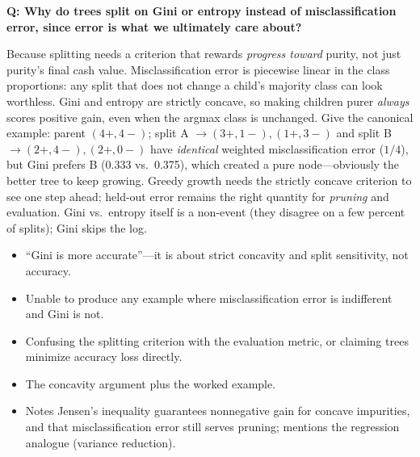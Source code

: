 \begin{interviewq}
\textbf{Q: Why do trees split on Gini or entropy instead of misclassification error, since error is what we ultimately care about?}

 \quad {} \quad \badgefreq{\freqmed}

\stronganswer

Because splitting needs a criterion that rewards \textit{progress toward} purity, not just purity's final cash value. Misclassification error is piecewise linear in the class proportions: any split that does not change a child's majority class can look worthless. Gini and entropy are strictly concave, so making children purer \textit{always} scores positive gain, even when the argmax class is unchanged. Give the canonical example: parent $(4{+},4{-})$; split A $\to (3{+},1{-}), (1{+},3{-})$ and split B $\to (2{+},4{-}), (2{+},0{-})$ have \textit{identical} weighted misclassification error ($1/4$), but Gini prefers B (0.333 vs.\ 0.375), which created a pure node---obviously the better tree to keep growing. Greedy growth needs the strictly concave criterion to see one step ahead; held-out error remains the right quantity for \textit{pruning} and evaluation. Gini vs.\ entropy itself is a non-event (they disagree on a few percent of splits); Gini skips the log.

\redflags
\begin{itemize}
    \item ``Gini is more accurate''---it is about strict concavity and split sensitivity, not accuracy.
    \item Unable to produce any example where misclassification error is indifferent and Gini is not.
    \item Confusing the splitting criterion with the evaluation metric, or claiming trees minimize accuracy loss directly.
\end{itemize}


\goodgreat
\begin{itemize}
    \item {} The concavity argument plus the worked example.
    \item {} Notes Jensen's inequality guarantees nonnegative gain for concave impurities, and that misclassification error still serves pruning; mentions the regression analogue (variance reduction).
\end{itemize}

\end{interviewq}

